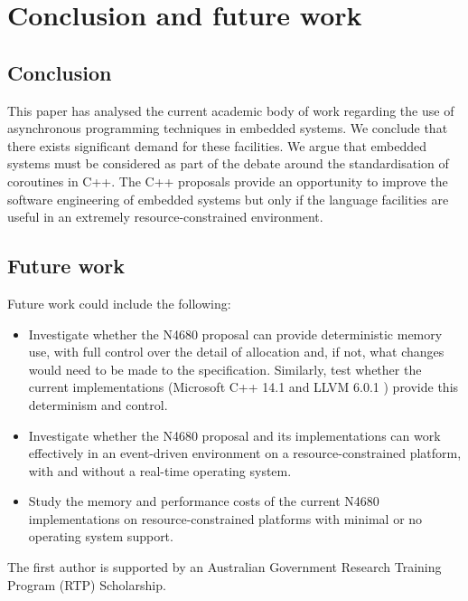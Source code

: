 \documentclass[format=acmsmall, review=false, screen=false]{acmart}
\begin{document}
\section{Conclusion and future work}
\label{section:conclusion}

\subsection{Conclusion}

This paper has analysed the current academic body of work regarding the use of asynchronous programming techniques in embedded systems. We conclude that there exists significant demand for these facilities. We argue that embedded systems must be considered as part of the debate around the standardisation of coroutines in C++. The C++ proposals provide an opportunity to improve the software engineering of embedded systems but only if the language facilities are useful in an extremely resource-constrained environment.

\subsection{Future work}

Future work could include the following:
\begin{itemize}
	\item Investigate whether the N4680 proposal can provide deterministic memory use, with full control over the detail of allocation and, if not, what changes would need to be made to the specification. Similarly, test whether the current implementations (Microsoft C++ 14.1 \cite{Microsoft2018} and LLVM 6.0.1 \cite{LLVMProject2018}) provide this determinism and control.
	\item Investigate whether the N4680 proposal and its implementations can work effectively in an event-driven environment on a resource-constrained platform, with and without a real-time operating system.
	\item Study the memory and performance costs of the current N4680 implementations on resource-constrained platforms with minimal or no operating system support.
\end{itemize}

\begin{acks}
The first author is supported by an Australian Government Research Training Program (RTP) Scholarship.
\end{acks}



\end{document}
